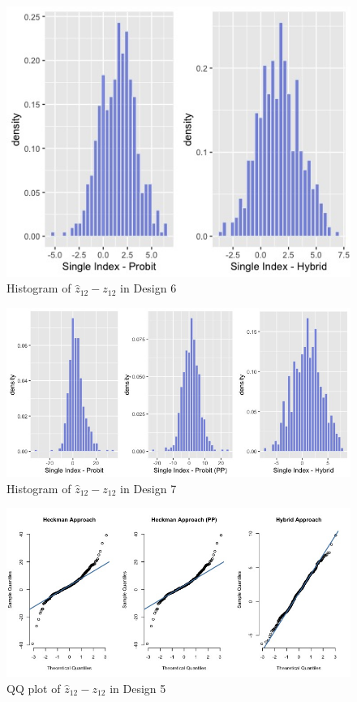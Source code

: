 \begin{figure}[htbp]
  \centerline{\includegraphics[scale=.4]{content/Figures/Hist_Zij_Design6.png}}
  \caption{\footnotesize{Histogram of $\hat{z}_{12} - z_{12}$ in Design 6}}
  \label{Hist_Zij_Design6}
\end{figure}
\begin{figure}[htbp]
  \centerline{\includegraphics[scale=.4]{content/Figures/Hist_Zij_Design7.png}}
  \caption{\footnotesize{Histogram of $\hat{z}_{12} - z_{12}$ in Design 7}}
  \label{Hist_Zij_Design7}
\end{figure}
\begin{figure}[htbp]
  \centerline{\includegraphics[scale=.4]{content/Figures/QQ_Zij_Design5.png}}
  \caption{\footnotesize{QQ plot of $\hat{z}_{12} - z_{12}$ in Design 5}}
  \label{QQ_Zij_Design5}
\end{figure}
